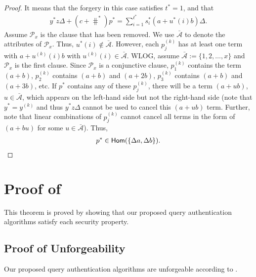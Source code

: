 \begin{proof}
It means that the forgery in this case satisfies $t^\ast =1$, and that
\begin{align*}
  y^\ast z  \Delta + (c + \hash^\ast)p^\ast = \sum_{i=1}^{\ell^\ast} s^\ast_i (a+u^\ast(i)b)\Delta.
\end{align*}
Assume $\mathcal{P}_x$ is the clause that has been removed. We use $\bar{\mathcal{A}}$ to denote the attributes of $\mathcal{P}_x$. Thus, $u^\ast(i) \notin \bar{\mathcal{A}}$. However, each $p_{j}^{(k)}$ has at least one term with $a + u^{(k)}(i)b$ with $u^{(k)}(i) \in \bar{\mathcal{A}}$. WLOG, assume $\bar{\mathcal{A}}:=\{1,2, \dots, x\}$ and $\mathcal{P}_x$ is the first clause. Since $\mathcal{P}_x$ is a conjunctive clause, $p^{(k)}_1$ contains the term $(a+b)$, $p^{(k)}_2$ contains $(a+b)$ and $(a+2b)$, $p^{(k)}_3$ contains $(a+b)$ and $(a+3b)$, etc. If $p^\ast$ contains any of these $p^{(k)}_{j}$, there will be a term $(a+ub)$, $u\in\bar{\mathcal{A}}$, which appears on the left-hand side but not the right-hand side (note that $y^{\ast} = y^{(k)}$ and thus $y^\ast z \Delta$ cannot be used to cancel this $(a+ub)$ term. Further, note that linear combinations of $p^{(k)}_j$ cannot cancel all terms in the form of $(a+bu)$ for some $u \in \bar{\mathcal{A}}$). Thus,
\begin{align*}
  p^\ast \in \textsf{Hom}( \{\Delta a, \Delta b\} ).
\end{align*}
\end{proof}

\chapter{Proof of \texorpdfstring{}{Theorem~\ref{thm:access-control:sec}}}%
\label{app:access-control-sec}

\querysecuritytheorem*

This theorem is proved by showing that our proposed query authentication algorithms satisfy each security property.

\section{Proof of Unforgeability}

\begin{lemma}\label{lemma:access-control:query-secure}
  Our proposed query authentication algorithms are unforgeable according to .
\end{lemma}

